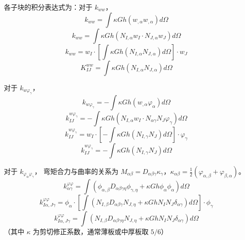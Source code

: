 各子块的积分表达式为：对于 $k_{ww}$，
\begin{equation}
k_{ww} = \int \kappa Gh(w_{,\alpha}w_{,\alpha})d\Omega
\end{equation}
\begin{equation}
k_{ww} = \int \kappa Gh(N_{I,\alpha}w_I\cdot N_{J,\alpha}w_J)d\Omega
\end{equation}
\begin{equation}
k_{ww} = w_I\cdot\left[\int \kappa Gh(N_{I,\alpha}N_{J,\alpha})d\Omega\right]\cdot w_J
\end{equation}
\begin{equation}
\boxed{K_{IJ}^{ww} = \int \kappa Gh(N_{I,\alpha}N_{J,\alpha})d\Omega}
\end{equation}

对于 $k_{w\varphi_\gamma}$，
\begin{equation}
k_{w\varphi_\gamma} = -\int \kappa Gh(w_{,\alpha}\varphi_\alpha)d\Omega
\end{equation}
\begin{equation}
k_{IJ}^{w\varphi_\gamma} = -\int \kappa Gh(N_{I,\alpha}w_I\cdot N_{\alpha\gamma}N_J\varphi_\gamma)d\Omega
\end{equation}
\begin{equation}
k_{IJ}^{w\varphi_\gamma} = w_I\cdot\left[-\int \kappa Gh(N_{I,\gamma}N_J)d\Omega\right]\cdot\varphi_\gamma
\end{equation}
\begin{equation}
\boxed{k_{IJ}^{w\varphi_\gamma} = -\int \kappa Gh(N_{I,\gamma}N_J)d\Omega}
\end{equation}

对于 $k_{\varphi_\alpha\varphi_\gamma}$，
弯矩合力与曲率的关系为 $M_{\alpha\beta}=D_{\alpha\beta\gamma}\kappa_\gamma$，$\kappa_{\alpha\beta}=\frac{1}{2}(\varphi_{\alpha,\beta}+\varphi_{\beta,\alpha})$。
\begin{equation}
k_{\alpha\gamma}^{\varphi\varphi} = \int(\phi_{\alpha,\beta}D_{\alpha\beta\gamma\eta}\phi_{\gamma,\eta} + \kappa Gh\phi_\alpha\phi_\alpha)d\Omega
\end{equation}
\begin{equation}
k_{I\alpha,J\gamma}^{\varphi\varphi} = \phi_\alpha\cdot\left[\int(N_{I,\beta}D_{\alpha\beta\gamma}N_{J,\eta} + \kappa GhN_IN_J\delta_{\alpha\gamma})d\Omega\right]\cdot\phi_\gamma
\end{equation}
\begin{equation}
\boxed{k_{I\alpha,J\gamma}^{\varphi\varphi} = \int(N_{I,\beta}D_{\alpha\beta\gamma\eta}N_{J,\eta} + \kappa GhN_IN_J\delta_{\alpha\gamma})d\Omega}
\end{equation}
（其中 $\kappa$ 为剪切修正系数，通常薄板或中厚板取 $5/6$）

